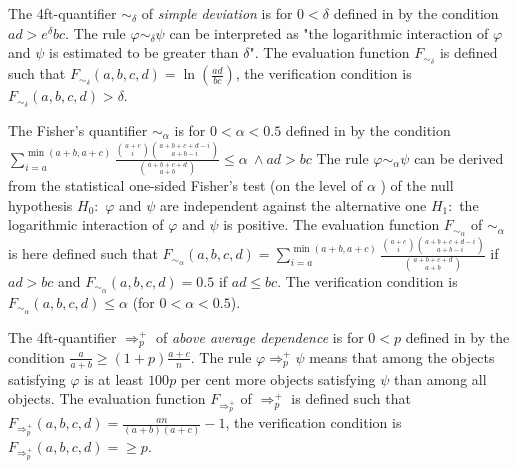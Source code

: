 The 4ft-quantifier 
$ \sim_{\delta} $ of {\it simple deviation \/} 
is for $ 0 < \delta $ defined in \cite{Ha:78} 
by the condition $ ad > e^{\delta}bc $.
The rule $\varphi \sim_{\delta}  \psi $  
can be interpreted as "the logarithmic interaction of $\varphi $ 
and $ \psi $ is estimated to be greater than $\delta$". 
The evaluation function $ F_{\sim_{\delta}}$
 is defined such that 
$ F_{\sim_{\delta}}(a,b,c,d) =  \ln(\frac{ad}{bc}) $, 
the verification condition is $ F_{\sim_{\delta}}(a,b,c,d) > \delta$.

The Fisher's quantifier $ \sim_{\alpha} $ is 
 for $ 0 < \alpha < 0.5$ defined in \cite{Ha:78} by the condition
$  \sum_{i = a}^{\min(a+b,a+c)} \frac{ {a+c \choose i} {a+b+c+d - i \choose a+b - i} }
                               {{a+b+c+d \choose a+b }}  \leq \alpha \  \land ad > bc $
The rule $\varphi \sim_{\alpha}  \psi $ 
can be derived from the statistical one-sided Fisher's 
 test (on the level of $ \alpha$ ) of the null hypothesis  
$H_{0}:$  $\varphi$  and $\psi $ are independent 
 against the  alternative  one  $H_{1}: $ 
 the logarithmic interaction of $\varphi$  and $\psi $ is positive. 
The evaluation function $ F_{\sim_{\alpha}}$
of $\sim_{\alpha}$ is here defined such that 
$ F_{\sim_{\alpha}}(a,b,c,d) =  \sum_{i = a}^{\min(a+b,a+c)} \frac{ {a+c \choose i} {a+b+c+d - i \choose a+b - i} }
                               {{a+b+c+d \choose a+b }}    $  
if $ad > bc$ and 
$ F_{\sim_{\alpha}}(a,b,c,d) =  0.5 $  if $ad \leq bc$.  
The verification condition is $ F_{\sim_{\alpha}}(a,b,c,d) \leq \alpha $ (for $ 0 < \alpha < 0.5$). 

%
%
%

The 4ft-quantifier 
$ \Rightarrow^{+}_{p} $ of {\it above average dependence \/} 
is for $ 0 < p $ defined  
in \cite{RS:05A} by the condition
$ \frac{a}{a+b} \geq (1+p) \frac{a+c}{n} $.
The rule $\varphi \Rightarrow^{+}_{p}  \psi $  
means that among the objects satisfying $\varphi$ is at least
$100p$ per cent more objects satisfying $\psi$ than among all
objects. 
The evaluation function $ F_{\Rightarrow^{+}_{p}}$
of $\Rightarrow^{+}_{p}$ is defined such that 
$ F_{\Rightarrow^{+}_{p}}(a,b,c,d) =  \frac{ an} {(a+b)(a+c)} - 1$, 
the verification condition is $ F_{\Rightarrow^{+}_{p}}(a,b,c,d) =  \geq p$.


